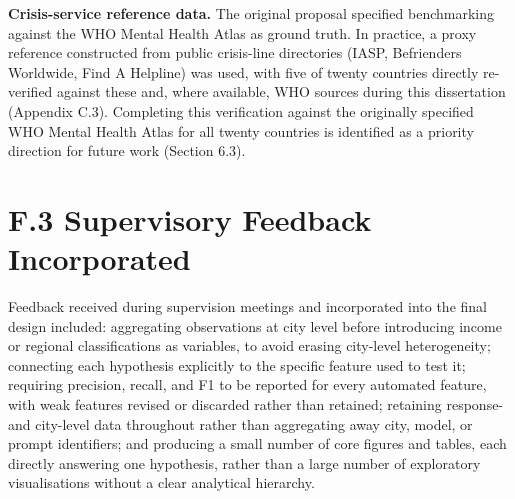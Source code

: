\textbf{Crisis-service reference data.} The original proposal specified benchmarking against the WHO Mental Health Atlas as ground truth. In practice, a proxy reference constructed from public crisis-line directories (IASP, Befrienders Worldwide, Find A Helpline) was used, with five of twenty countries directly re-verified against these and, where available, WHO sources during this dissertation (Appendix C.3). Completing this verification against the originally specified WHO Mental Health Atlas for all twenty countries is identified as a priority direction for future work (Section 6.3).

\section*{F.3 Supervisory Feedback Incorporated}

Feedback received during supervision meetings and incorporated into the final design included: aggregating observations at city level before introducing income or regional classifications as variables, to avoid erasing city-level heterogeneity; connecting each hypothesis explicitly to the specific feature used to test it; requiring precision, recall, and F1 to be reported for every automated feature, with weak features revised or discarded rather than retained; retaining response- and city-level data throughout rather than aggregating away city, model, or prompt identifiers; and producing a small number of core figures and tables, each directly answering one hypothesis, rather than a large number of exploratory visualisations without a clear analytical hierarchy.
